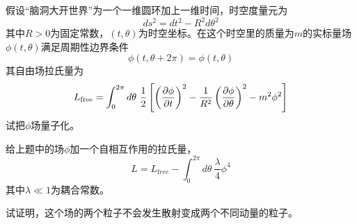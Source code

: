 \documentclass[CJK]{beamer}
\begin{document}
\begin{frame}
\bch
假设“脑洞大开世界”为一个一维圆环加上一维时间，时空度量元为
$$ds^2 = dt^2 - R^2 d\theta^2$$
其中$R>0$为固定常数，$(t,\theta)$为时空坐标。在这个时空里的质量为$m$的实标量场$\phi(t,\theta)$满足周期性边界条件
$$\phi(t,\theta+2\pi) = \phi(t,\theta)$$
其自由场拉氏量为
$$L_{\rm free} = \int_0^{2\pi}d\theta\ \frac{1}{2}\left[\left(\frac{\partial\phi}{\partial t}\right)^2-\frac{1}{R^2}\left(\frac{\partial\phi}{\partial\theta}\right)^2-m^2\phi^2\right]$$
试把$\phi$场量子化。

\ech
\end{frame}


\begin{frame}
\bch
给上题中的场$\phi$加一个自相互作用的拉氏量，
$$L = L_{\mathrm free} - \int_0^{2\pi}d\theta\ \frac{\lambda}{4}\phi^4$$
其中$\lambda\ll 1$为耦合常数。

试证明，这个场的两个粒子不会发生散射变成两个不同动量的粒子。

\ech
\end{frame}
\end{document}

